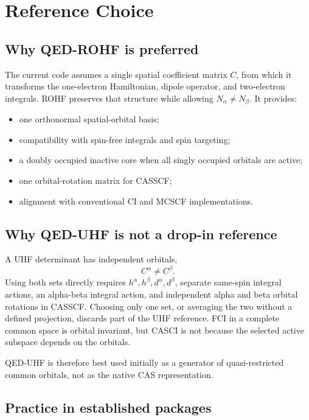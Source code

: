\documentclass[11pt]{article}
\begin{document}
\section{Reference Choice}

\subsection{Why QED-ROHF is preferred}

The current code assumes a single spatial coefficient matrix \(C\), from which
it transforms the one-electron Hamiltonian, dipole operator, and two-electron
integrals. ROHF preserves that structure while allowing
\(N_\alpha\ne N_\beta\). It provides:
\begin{itemize}
  \item one orthonormal spatial-orbital basis;
  \item compatibility with spin-free integrals and spin targeting;
  \item a doubly occupied inactive core when all singly occupied orbitals are
  active;
  \item one orbital-rotation matrix for CASSCF;
  \item alignment with conventional CI and MCSCF implementations.
\end{itemize}

\subsection{Why QED-UHF is not a drop-in reference}

A UHF determinant has independent orbitals,
\[
C^\alpha\ne C^\beta.
\]
Using both sets directly requires \(h^\alpha,h^\beta,d^\alpha,d^\beta\),
separate same-spin integral actions, an alpha-beta integral action, and
independent alpha and beta orbital rotations in CASSCF. Choosing only one set,
or averaging the two without a defined projection, discards part of the UHF
reference. FCI in a complete common space is orbital invariant, but CASCI is
not because the selected active subspace depends on the orbitals.

QED-UHF is therefore best used initially as a generator of quasi-restricted
common orbitals, not as the native CAS representation.

\subsection{Practice in established packages}
\end{document}
